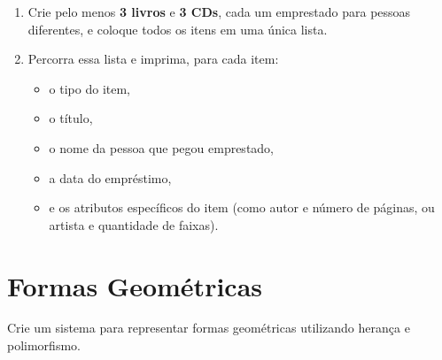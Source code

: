 \documentclass{article}
\begin{document}
\begin{enumerate}
    \item Crie pelo menos \textbf{3 livros} e \textbf{3 CDs}, cada um emprestado para pessoas diferentes,
          e coloque todos os itens em uma única lista.

    \item Percorra essa lista e imprima, para cada item:
          \begin{itemize}
              \item o tipo do item,
              \item o título,
              \item o nome da pessoa que pegou emprestado,
              \item a data do empréstimo,
              \item e os atributos específicos do item (como autor e número de páginas, ou artista e quantidade de faixas).
          \end{itemize}
\end{enumerate}

\section{Formas Geométricas}

Crie um sistema para representar formas geométricas utilizando herança e polimorfismo.
\end{document}
